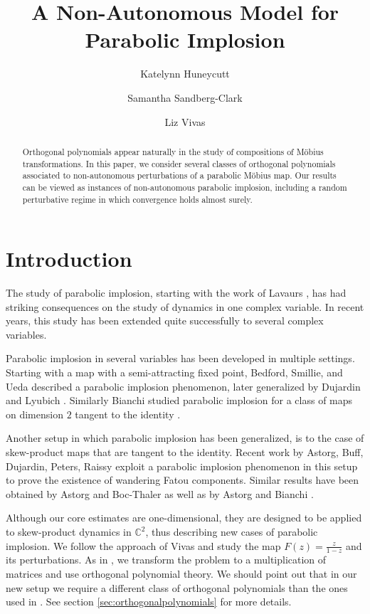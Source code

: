 \documentclass{amsart}
\title[A Non-Autonomous Model for Parabolic Implosion]{A Non-Autonomous Model for Parabolic Implosion}
\author{Katelynn Huneycutt}
\author{Samantha Sandberg-Clark}
\author{Liz Vivas}
\theoremstyle{remark}
\theoremstyle{definition}
\begin{document}
\begin{abstract}
Orthogonal polynomials appear naturally in the study of compositions of M\"obius transformations. In this paper, we consider several classes of orthogonal polynomials associated to non-autonomous perturbations of a parabolic M\"obius  map. Our results can be viewed as instances of non-autonomous parabolic implosion, including a random perturbative regime in which convergence holds almost surely.
\end{abstract}

\maketitle





\section{Introduction}

The study of parabolic implosion, starting with the work of Lavaurs \cite{Lavaurs1989}, has had striking consequences on the study of dynamics in one complex variable.  In recent years, this study has been extended quite successfully to several complex variables. 

Parabolic implosion in several variables has been developed in multiple settings. Starting with a map with a semi-attracting fixed point, Bedford, Smillie, and Ueda \cite{Bed16} described a parabolic implosion phenomenon, later generalized by Dujardin and Lyubich \cite{DuLy15}. Similarly Bianchi studied parabolic implosion for a class of maps on dimension $2$ tangent to the identity \cite{Bia19}.

Another setup in which parabolic implosion has been generalized, is to the case of skew-product maps that are tangent to the identity. Recent work by Astorg, Buff, Dujardin, Peters, Raissy \cite{ABD+16} exploit a parabolic implosion phenomenon in this setup to prove the existence of wandering Fatou components. Similar results have been obtained by Astorg and Boc-Thaler \cite{AstBoc22} as well as by Astorg and Bianchi \cite{AstBia24}.

Although our core estimates are one-dimensional, they are designed to be applied to skew-product dynamics in $\mathbb{C}^2$, thus describing new cases of parabolic implosion. We follow the approach of Vivas and study the map $F(z)=\frac{z}{1-z}$ and its perturbations.  As in \cite{Viv20}, we transform the problem to a multiplication of matrices and use orthogonal polynomial theory. We should point out that in our new setup we require a different class of orthogonal polynomials than the ones used in \cite{Viv20}. See section \ref{sec:orthogonalpolynomials} for more details.
\end{document}
